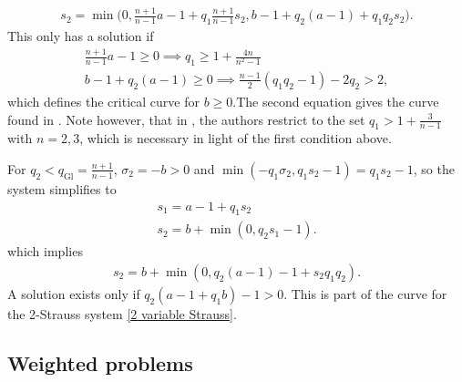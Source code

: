 \documentclass[11pt, oneside]{amsart}
\begin{document}
	\begin{equation*}
		\begin{gathered}
			s_2=\min\bigg(0,\frac{n+1}{n-1}a-1+q_1\frac{n+1}{n-1}s_2,b-1+q_2(a-1)+q_1q_2s_2\bigg).
	\end{gathered}
	\end{equation*}
	This only has a solution if
	\begin{equation}\label{hidano null}
		\begin{gathered}
			\frac{n+1}{n-1}a-1\geq0\implies q_1\geq1+\frac{4n}{n^2-1}\\
			b-1+q_2(a-1)\geq0\implies\frac{n-1}{2}(q_1q_2-1)-2q_2>2,
		\end{gathered}
	\end{equation}
	which defines the critical curve for $b\geq0$.The second equation gives the curve found in \cite{hidano_global_2022}. Note however, that in \cite{hidano_global_2022}, the authors restrict to the set $q_1>1+\frac{3}{n-1}$ with $n=2,3$, which is necessary in light of the first condition above.

	For $q_2<q_{\text{Gl}}=\frac{n+1}{n-1}$, $\sigma_2=-b>0$ and $\min(-q_1\sigma_2,q_1s_2-1)=q_1s_2-1$, so the system simplifies to
	\begin{equation*}
		\begin{gathered}
			s_1=a-1+q_1s_2\\
			s_2=b+\min(0,q_2s_1-1).
		\end{gathered}
	\end{equation*}
	which implies
	\begin{equation*}
		\begin{gathered}
			s_2=b+\min(0,q_2(a-1)-1+s_2q_1q_2).
		\end{gathered}
	\end{equation*}
	A solution exists only if $q_2(a-1+q_1b)-1>0$. This is part of the curve for the 2-Strauss system \eqref{2 variable Strauss}.
	
	
	\begin{figure}[h]
	\end{figure}


	\subsection{Weighted problems}
\end{document}
